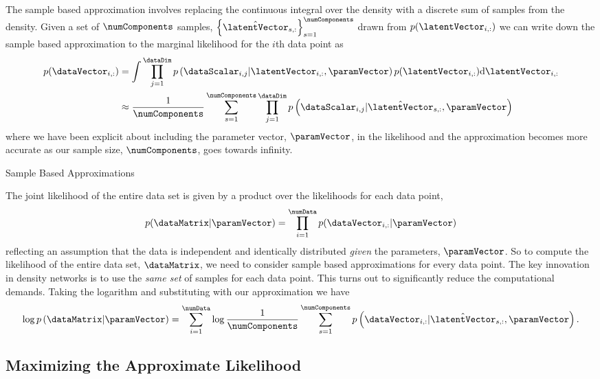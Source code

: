 The sample based approximation involves replacing the continuous integral over the density with a discrete sum of samples from the density. Given a set of $\numComponents$ samples, $\left\{\hat{\latentVector}_{s, :}\right\}_{s=1}^\numComponents$ drawn from $p(\latentVector_{i, :})$ we can write down the sample based approximation to the marginal likelihood for the $i$th data point as
\begin{align*}
p(\dataVector_{i, :}) & = \int \prod_{j=1}^\dataDim p\left(\dataScalar_{i,j}| \latentVector_{i,:}, \paramVector\right) p(\latentVector_{i,:}) \text{d}\latentVector_{i, :}\\
 &\approx \frac{1}{\numComponents} \sum_{s=1}^{\numComponents}\prod_{j=1}^\dataDim p\left(\dataScalar_{i,j}| \hat{\latentVector}_{s,:}, \paramVector\right) 
\end{align*}
where we have been explicit about including the parameter vector, $\paramVector$, in the likelihood and the approximation becomes more accurate as our sample size, $\numComponents$, goes towards infinity.
\begin{boxfloat}
\caption{Sample Based Approximations}\label{box:sample}
\end{boxfloat}
The joint likelihood of the entire data set is given by a product over the likelihoods for each data point,
\[
p(\dataMatrix|\paramVector) = \prod_{i=1}^\numData p(\dataVector_{i, :}|\paramVector)
\]
reflecting an assumption that the data is independent and identically distributed \emph{given} the parameters, $\paramVector$. So to compute the likelihood of the entire data set, $\dataMatrix$, we need to consider sample based approximations for every data point. The key innovation in density networks is to use the \emph{same set} of samples for each data point. This turns out to significantly reduce the computational demands. Taking the logarithm and substituting with our approximation we have
\[
\log p\left(\dataMatrix|\paramVector\right)=\sum_{i=1}^{\numData}\log\frac{1}{\numComponents}\sum_{s=1}^{\numComponents}p\left(\dataVector_{i,:}|\hat{\latentVector}_{s,:}, \paramVector\right).
\]
\subsection{Maximizing the Approximate Likelihood}

